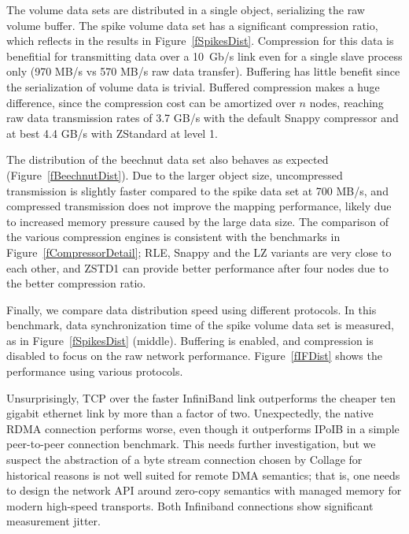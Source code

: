 \documentclass[10pt,journal,compsoc]{IEEEtran}
\newcommand{\fig}[1]{Figure~\ref{#1}}
\begin{document}
The volume data sets are distributed in a single object, serializing the
raw volume buffer. The spike volume data set has a significant compression
ratio, which reflects in the results in \fig{fSpikesDist}. Compression for this
data is benefitial for transmitting data over a 10~Gb/s link even for a single
slave process only (970 MB/s vs 570 MB/s raw data transfer). Buffering has
little benefit since the serialization of volume data is trivial. Buffered
compression makes a huge difference, since the compression cost can be amortized
over $n$ nodes, reaching raw data transmission rates of 3.7 GB/s with the
default Snappy compressor and at best 4.4 GB/s with ZStandard at level 1.

The distribution of the beechnut data set also behaves as expected
(\fig{fBeechnutDist}). Due to the larger object size, uncompressed transmission
is slightly faster compared to the spike data set at 700 MB/s, and compressed
transmission does not improve the mapping performance, likely due to increased
memory pressure caused by the large data size. The comparison of the various
compression engines is consistent with the benchmarks in
\fig{fCompressorDetail}; RLE, Snappy and the LZ variants are very close to each
other, and ZSTD1 can provide better performance after four nodes due to the
better compression ratio.

Finally, we compare data distribution speed using different protocols. In this
benchmark, data synchronization time of the spike volume data set is measured,
as in \fig{fSpikesDist} (middle). Buffering is enabled, and compression is
disabled to focus on the raw network performance. \fig{fIFDist} shows the
performance using various protocols.

Unsurprisingly, TCP over the faster InfiniBand link outperforms the cheaper ten
gigabit ethernet link by more than a factor of two. Unexpectedly, the native
RDMA connection performs worse, even though it outperforms IPoIB in a simple
peer-to-peer connection benchmark. This needs further investigation, but we
suspect the abstraction of a byte stream connection chosen by \textsf{Collage}
for historical reasons is not well suited for remote DMA semantics; that is,
one needs to design the network API around zero-copy semantics with managed
memory for modern high-speed transports. Both Infiniband connections show
significant measurement jitter.
\end{document}
